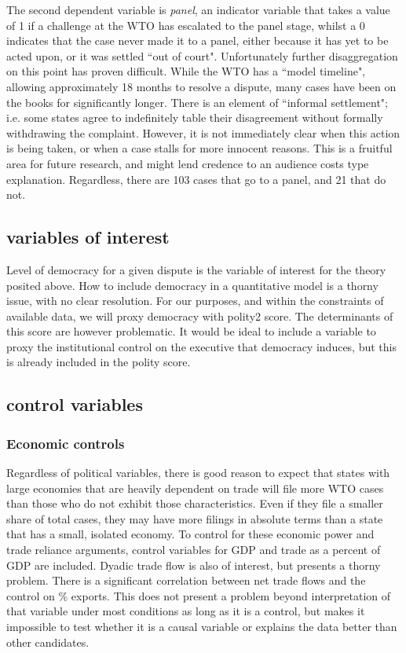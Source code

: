 \documentclass[]{article}
\begin{document}
The second dependent variable is \textit{panel}, an indicator variable that takes a value of 1 if a challenge at the WTO has escalated to the panel stage, whilst a 0 indicates that the case never made it to a panel, either because it has yet to be acted upon, or it was settled ``out of court". Unfortunately further disaggregation on this point has proven difficult. While the WTO has a ``model timeline", allowing approximately 18 months to resolve a dispute,  many cases have been on the books for significantly longer. There is an element of ``informal settlement"; i.e. some states agree to indefinitely table their disagreement without formally withdrawing the complaint. However, it is not immediately clear when this action is being taken, or when a case stalls for more innocent reasons.  This is a fruitful area for future research,  and might lend credence to an audience costs type explanation. Regardless, there are 103 cases that go to a panel, and 21 that do not. 

\subsection{variables of interest}
Level of democracy for a given dispute is the variable of interest for the theory posited above. How to include democracy in a quantitative model is a thorny issue, with no clear resolution.  For our purposes, and within the constraints of available data,  we will proxy democracy with polity2 score. The determinants of this score are however problematic. It would be ideal to include a variable to proxy the institutional control on the executive that democracy induces, but this is already included in the polity score.  

\subsection{control variables}
\subsubsection{Economic controls}
Regardless of political variables, there is good reason to expect that states with large economies that are heavily dependent on trade will file more WTO cases than those who do not exhibit those characteristics. Even if they file a smaller share of total cases, they may have more filings in absolute terms than a state that has a small, isolated economy. To control for these economic power and trade reliance arguments, control variables for GDP and trade as a percent of GDP are included. Dyadic trade flow is also of interest, but presents a thorny  problem. There is a significant correlation between net trade flows and the control on \% exports. This does not present a problem beyond interpretation of that variable under most conditions as long as it is a control, but makes it impossible to test whether it is a causal variable or explains the data better than other candidates.  
\end{document}
